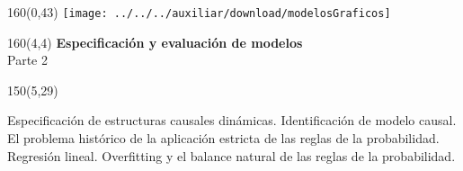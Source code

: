 \documentclass[shownotes,aspectratio=169]{beamer}
\begin{document}
%
%
%
%
%
%
%



\begin{frame}
\begin{textblock}{160}(0,43)
\texttt{[image: ../../../auxiliar/download/modelosGraficos]}
\end{textblock}


\begin{textblock}{160}(4,4)
\LARGE \textcolor{black!85}{\fontsize{22}{0}\selectfont \textbf{Especificación y evaluación de modelos}} \\
\LARGE Parte 2
\end{textblock}

\begin{textblock}{150}(5,29)

Especificación de estructuras causales dinámicas. Identificación de modelo causal. El problema histórico de la aplicación estricta de las reglas de la probabilidad. Regresión lineal. Overfitting y el balance natural de las reglas de la probabilidad.
\end{textblock}
%

\end{frame}
\end{document}
